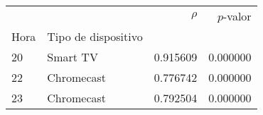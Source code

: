 \begin{tabular}{llrr}
\toprule
 &  & $\rho$ & $p$-valor \\
Hora & Tipo de dispositivo &  &  \\
\midrule
20 & Smart TV & 0.915609 & 0.000000 \\
\cline{1-4}
22 & Chromecast & 0.776742 & 0.000000 \\
\cline{1-4}
23 & Chromecast & 0.792504 & 0.000000 \\
\cline{1-4}
\bottomrule
\end{tabular}
